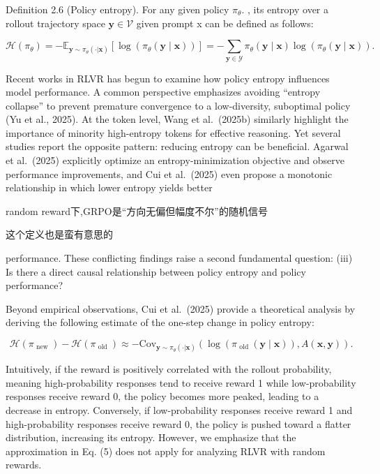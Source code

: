 \documentclass[
  10
]{article}
\begin{document}
Definition 2.6 (Policy entropy). For any given policy
\(\pi _ { \theta } .\) , its entropy over a rollout trajectory space
\(\mathbf { y } \in \mathcal { V }\) given prompt x can be defined as
follows:

\[
\mathcal {H} (\pi_ {\theta}) = - \mathbb {E} _ {\mathbf {y} \sim \pi_ {\theta} (\cdot | \mathbf {x})} [ \log (\pi_ {\theta} (\mathbf {y} \mid \mathbf {x})) ] = - \sum_ {\mathbf {y} \in \mathcal {Y}} \pi_ {\theta} (\mathbf {y} \mid \mathbf {x}) \log (\pi_ {\theta} (\mathbf {y} \mid \mathbf {x})).
\]

Recent works in RLVR has begun to examine how policy entropy influences
model performance. A common perspective emphasizes avoiding ``entropy
collapse'' to prevent premature convergence to a low-diversity,
suboptimal policy (Yu et al., 2025). At the token level, Wang et
al.~(2025b) similarly highlight the importance of minority high-entropy
tokens for effective reasoning. Yet several studies report the opposite
pattern: reducing entropy can be beneficial. Agarwal et al.~(2025)
explicitly optimize an entropy-minimization objective and observe
performance improvements, and Cui et al.~(2025) even propose a monotonic
relationship in which lower entropy yields better

random reward下,GRPO是``方向无偏但幅度不尔''的随机信号

这个定义也是蛮有意思的

performance. These conflicting findings raise a second fundamental
question: (iii) Is there a direct causal relationship between policy
entropy and policy performance?

Beyond empirical observations, Cui et al.~(2025) provide a theoretical
analysis by deriving the following estimate of the one-step change in
policy entropy:

\[
\mathcal {H} (\pi_ {\text { new }}) - \mathcal {H} (\pi_ {\text { old }}) \approx - \mathrm{Cov} _ {\mathbf {y} \sim \pi_ {\theta} (\cdot | \mathbf {x})} (\log (\pi_ {\text { old }} (\mathbf {y} \mid \mathbf {x})), A (\mathbf {x}, \mathbf {y})). \tag {5}
\]

Intuitively, if the reward is positively correlated with the rollout
probability, meaning high-probability responses tend to receive reward 1
while low-probability responses receive reward 0, the policy becomes
more peaked, leading to a decrease in entropy. Conversely, if
low-probability responses receive reward 1 and high-probability
responses receive reward 0, the policy is pushed toward a flatter
distribution, increasing its entropy. However, we emphasize that the
approximation in Eq. (5) does not apply for analyzing RLVR with random
rewards.
\end{document}
